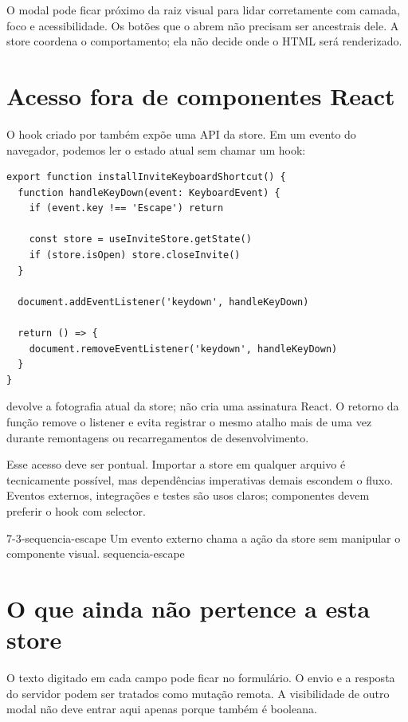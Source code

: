 O modal pode ficar próximo da raiz visual para lidar corretamente com camada,
foco e acessibilidade. Os botões que o abrem não precisam ser ancestrais dele.
A store coordena o comportamento; ela não decide onde o HTML será renderizado.

\section{Acesso fora de componentes React}

O hook criado por  também expõe uma API da store. Em um evento do
navegador, podemos ler o estado atual sem chamar um hook:

\begin{lstlisting}[caption={Atalho global usando a API imperativa.}]
export function installInviteKeyboardShortcut() {
  function handleKeyDown(event: KeyboardEvent) {
    if (event.key !== 'Escape') return

    const store = useInviteStore.getState()
    if (store.isOpen) store.closeInvite()
  }

  document.addEventListener('keydown', handleKeyDown)

  return () => {
    document.removeEventListener('keydown', handleKeyDown)
  }
}
\end{lstlisting}

 devolve a fotografia atual da store; não cria uma assinatura
React. O retorno da função remove o listener e evita registrar o mesmo atalho
mais de uma vez durante remontagens ou recarregamentos de desenvolvimento.

Esse acesso deve ser pontual. Importar a store em qualquer arquivo é tecnicamente
possível, mas dependências imperativas demais escondem o fluxo. Eventos externos,
integrações e testes são usos claros; componentes devem preferir o hook com
selector.

\imagemcapitulo
  {7-3-sequencia-escape}
  {Um evento externo chama a ação da store sem manipular o componente visual.}
  {sequencia-escape}

\section{O que ainda não pertence a esta store}

O texto digitado em cada campo pode ficar no formulário. O envio e a resposta do
servidor podem ser tratados como mutação remota. A visibilidade de outro modal
não deve entrar aqui apenas porque também é booleana.

